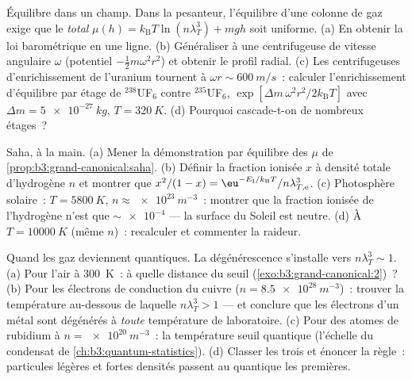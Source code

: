 \begin{exercise}[$\star\star$]\label{exo:b3:grand-canonical:9}
Équilibre dans un champ. Dans la pesanteur, l'équilibre d'une colonne
de gaz exige que le  \emph{total} $\mu(h) =
k_{\text{B}}T\ln(n\lambda_T^3) + mgh$ soit uniforme. (a) En obtenir la
loi barométrique en une ligne. (b) Généraliser à une centrifugeuse de
vitesse angulaire $\omega$ (potentiel $-\tfrac12 m\omega^2r^2$) et
obtenir le profil radial. (c) Les centrifugeuses d'enrichissement de
l'uranium tournent à $\omega r \sim
\qty{600}{m/s}$~: calculer l'enrichissement d'équilibre par étage de
$^{238}$UF$_6$ contre $^{235}$UF$_6$, $\exp[\Delta m\,\omega^2
r^2/2k_{\text{B}}T]$ avec $\Delta m = \qty{5e-27}{kg}$, $T =
\qty{320}{K}$. (d) Pourquoi cascade-t-on de nombreux étages~?
\end{exercise}

\begin{exercise}[$\star\star\star$]\label{exo:b3:grand-canonical:10}
Saha, à la main. (a) Mener la démonstration par équilibre des $\mu$ de
\cref{prop:b3:grand-canonical:saha}. (b) Définir la fraction
ionisée $x$ à densité totale d'hydrogène $n$ et montrer que $x^2/(1 - x)
= \eu^{-E_{\text{I}}/k_{\text{B}}T}/n\lambda_{T,\text{e}}^3$. (c)
Photosphère solaire~: $T = \qty{5800}{K}$, $n \approx
\qty{e23}{m^{-3}}$~: montrer que la fraction ionisée de l'hydrogène
n'est que $\sim\num{e-4}$ --- la surface du Soleil est neutre. (d) À $T =
\qty{10000}{K}$ (même $n$)~: recalculer et commenter la raideur.
\end{exercise}

\begin{exercise}[$\star\star\star$]\label{exo:b3:grand-canonical:11}
Quand les gaz deviennent quantiques. La dégénérescence s'installe vers $n\lambda_T^3 \sim
1$. (a) Pour l'air à \qty{300}{K}~: à quelle
distance du seuil (\cref{exo:b3:grand-canonical:2})~? (b) Pour les
électrons de conduction du cuivre ($n = \qty{8.5e28}{m^{-3}}$)~:
trouver la température au-dessous de laquelle $n\lambda_T^3 > 1$ ---
et conclure que les électrons d'un métal sont dégénérés à
\emph{toute} température de laboratoire. (c) Pour des atomes de
rubidium à $n = \qty{e20}{m^{-3}}$~: la température seuil quantique
(l'échelle du condensat de \cref{ch:b3:quantum-statistics}). (d)
Classer les trois et énoncer la règle~: particules légères et fortes
densités passent au quantique les premières.
\end{exercise}

